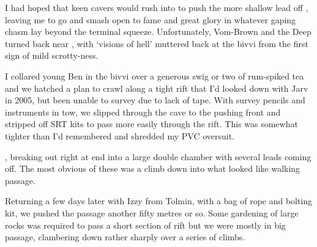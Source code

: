 
I had hoped that keen cavers would rush into  to push
the more shallow lead off , leaving me to go and smash
open  to fame and great glory in whatever gaping chasm lay
beyond the terminal squeeze. Unfortunately, Vom-Brown  and the Deep 
turned back near , with `visions of hell' muttered back at
the bivvi from the first sign of mild scrotty-ness.

I collared young Ben in the bivvi over a generous swig or two of
rum-spiked tea and we hatched a plan to crawl along a tight rift that
I'd looked down with Jarv in 2005, but been unable to survey due to lack
of tape. With survey pencils and instruments in tow, we slipped through
the cave to the pushing front and stripped off SRT kits to pass more
easily through the rift. This was somewhat tighter than I'd remembered
and shredded my PVC oversuit.

, breaking out right at end into a
large double chamber with several leads coming off. The most obvious of
these was a climb down into what looked like walking passage.

Returning a few days later with Izzy from Tolmin, with a bag of rope and
bolting kit, we pushed the passage another fifty metres or so. Some
gardening of large rocks was required to pass a short section of rift
but we were mostly in big passage, clambering down rather sharply over a
series of climbs.

